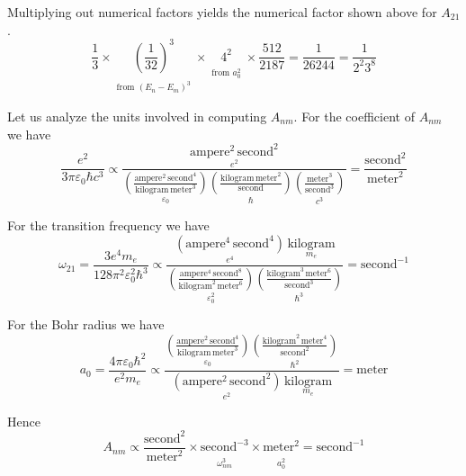 \documentclass[12pt]{article}
\begin{document}
\noindent
Multiplying out numerical factors yields the numerical factor shown above for $A_{21}$.
\begin{equation*}
\frac{1}{3}
\times
\underset{\substack{\\[1ex]\text{from $(E_n-E_m)^3$}}}
{\left(\frac{1}{32}\right)^3}
\times
\underset{\substack{\\[1ex]\text{from $a_0^2$}}}{4^2}
\times\frac{512}{2187}=\frac{1}{26244}=\frac{1}{2^2 3^8}
\end{equation*}

\noindent
Let us analyze the units involved in computing $A_{nm}$.
For the coefficient of $A_{nm}$ we have
\begin{equation*}
\frac{e^2}{3\pi\varepsilon_0\hbar c^3}\propto
\frac{
\underset{e^2}
{\text{ampere}^2\,\text{second}^2}
}
{
\underset{\varepsilon_0}
{\left(\frac{\text{ampere}^2\,\text{second}^4}{\text{kilogram}\,\text{meter}^3}\right)}
\underset{\hbar}
{\left(\frac{\text{kilogram}\,\text{meter}^2}{\text{second}}\right)}
\underset{c^3}
{\left(\frac{\text{meter}^3}{\text{second}^3}\right)}
}
=\frac{\text{second}^2}{\text{meter}^2}
\end{equation*}

\noindent
For the transition frequency we have
\begin{equation*}
\omega_{21}=
\frac{3e^4 m_e}{128\pi^2\varepsilon_0^2\hbar^3}
\propto
\frac{
\underset{e^4}
{\left(\text{ampere}^4\,\text{second}^4\right)}
\,
\underset{m_e}
{\text{kilogram}}
}
{
\underset{\varepsilon_0^2}
{\left(\frac{\text{ampere}^4\,\text{second}^8}{\text{kilogram}^2\,\text{meter}^6}\right)}
\underset{\hbar^3}
{\left(\frac{\text{kilogram}^3\,\text{meter}^6}{\text{second}^3}\right)}
}
=\text{second}^{-1}
\end{equation*}

\noindent
For the Bohr radius we have
\begin{equation*}
a_0=\frac{4\pi\varepsilon_0\hbar^2}{e^2 m_e}
\propto
\frac
{
\underset{\varepsilon_0}
{\left(\frac{\text{ampere}^2\,\text{second}^4}{\text{kilogram}\,\text{meter}^3}\right)}
\underset{\hbar^2}
{\left(\frac{\text{kilogram}^2\,\text{meter}^4}{\text{second}^2}\right)}
}
{
\underset{e^2}
{\left(\text{ampere}^2\,\text{second}^2\right)}
\,
\underset{m_e}
{\text{kilogram}}
}
=\text{meter}
\end{equation*}

\noindent
Hence
\begin{equation*}
A_{nm}\propto
\frac{\text{second}^2}{\text{meter}^2}
\times
\underset{\substack{\\[1ex]\omega_{nm}^3}}{\text{second}^{-3}}
\times
\underset{\substack{\\[1ex]a_0^2}}{\text{meter}^2}
=\text{second}^{-1}
\end{equation*}
\end{document}
